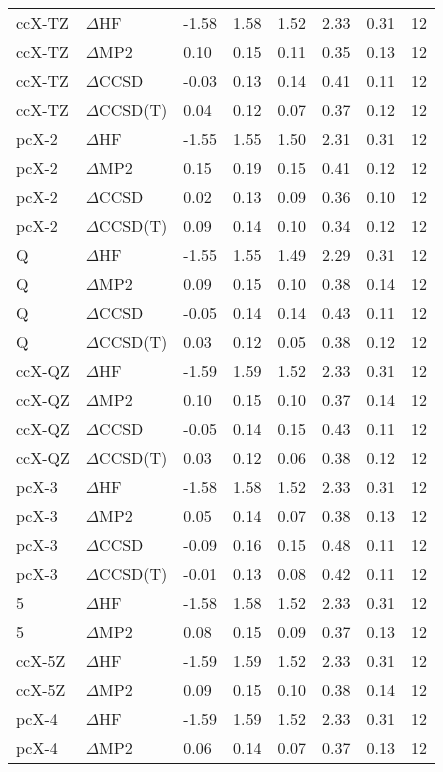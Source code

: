 \begin{table}
\begin{tabular}{l l l l l l l l }
    ccX-TZ & $\Delta$HF & -1.58 & 1.58 & 1.52 & 2.33 & 0.31 & 12 \\ 
    ccX-TZ & $\Delta$MP2 & 0.10 & 0.15 & 0.11 & 0.35 & 0.13 & 12 \\ 
    ccX-TZ & $\Delta$CCSD & -0.03 & 0.13 & 0.14 & 0.41 & 0.11 & 12 \\ 
    ccX-TZ & $\Delta$CCSD(T) & 0.04 & 0.12 & 0.07 & 0.37 & 0.12 & 12 \\ 
    pcX-2 & $\Delta$HF & -1.55 & 1.55 & 1.50 & 2.31 & 0.31 & 12 \\ 
    pcX-2 & $\Delta$MP2 & 0.15 & 0.19 & 0.15 & 0.41 & 0.12 & 12 \\ 
    pcX-2 & $\Delta$CCSD & 0.02 & 0.13 & 0.09 & 0.36 & 0.10 & 12 \\ 
    pcX-2 & $\Delta$CCSD(T) & 0.09 & 0.14 & 0.10 & 0.34 & 0.12 & 12 \\ 
    Q & $\Delta$HF & -1.55 & 1.55 & 1.49 & 2.29 & 0.31 & 12 \\ 
    Q & $\Delta$MP2 & 0.09 & 0.15 & 0.10 & 0.38 & 0.14 & 12 \\ 
    Q & $\Delta$CCSD & -0.05 & 0.14 & 0.14 & 0.43 & 0.11 & 12 \\ 
    Q & $\Delta$CCSD(T) & 0.03 & 0.12 & 0.05 & 0.38 & 0.12 & 12 \\ 
    ccX-QZ & $\Delta$HF & -1.59 & 1.59 & 1.52 & 2.33 & 0.31 & 12 \\ 
    ccX-QZ & $\Delta$MP2 & 0.10 & 0.15 & 0.10 & 0.37 & 0.14 & 12 \\ 
    ccX-QZ & $\Delta$CCSD & -0.05 & 0.14 & 0.15 & 0.43 & 0.11 & 12 \\ 
    ccX-QZ & $\Delta$CCSD(T) & 0.03 & 0.12 & 0.06 & 0.38 & 0.12 & 12 \\ 
    pcX-3 & $\Delta$HF & -1.58 & 1.58 & 1.52 & 2.33 & 0.31 & 12 \\ 
    pcX-3 & $\Delta$MP2 & 0.05 & 0.14 & 0.07 & 0.38 & 0.13 & 12 \\ 
    pcX-3 & $\Delta$CCSD & -0.09 & 0.16 & 0.15 & 0.48 & 0.11 & 12 \\ 
    pcX-3 & $\Delta$CCSD(T) & -0.01 & 0.13 & 0.08 & 0.42 & 0.11 & 12 \\ 
    5 & $\Delta$HF & -1.58 & 1.58 & 1.52 & 2.33 & 0.31 & 12 \\ 
    5 & $\Delta$MP2 & 0.08 & 0.15 & 0.09 & 0.37 & 0.13 & 12 \\ 
    ccX-5Z & $\Delta$HF & -1.59 & 1.59 & 1.52 & 2.33 & 0.31 & 12 \\ 
    ccX-5Z & $\Delta$MP2 & 0.09 & 0.15 & 0.10 & 0.38 & 0.14 & 12 \\ 
    pcX-4 & $\Delta$HF & -1.59 & 1.59 & 1.52 & 2.33 & 0.31 & 12 \\ 
    pcX-4 & $\Delta$MP2 & 0.06 & 0.14 & 0.07 & 0.37 & 0.13 & 12 \\ 
    \bottomrule
  \end{tabular}
\end{table}
